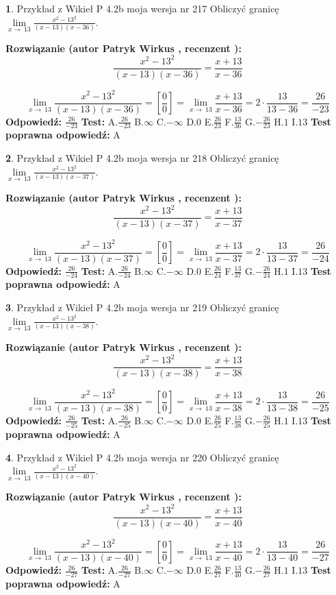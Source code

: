 \documentclass[12pt, a4paper]{article}
\theoremstyle{definition} %
\newtheorem{zad}{}
\newcommand{\zadStart}[1]{\begin{zad}#1\newline}
\newcommand{\zadStop}{\end{zad}}
\newcommand{\rozwStart}[2]{\noindent \textbf{Rozwiązanie (autor #1 , recenzent #2): }\newline}
\newcommand{\rozwStop}{\newline}
\newcommand{\odpStart}{\noindent \textbf{Odpowiedź:}\newline}
\newcommand{\odpStop}{\newline}
\newcommand{\testStart}{\noindent \textbf{Test:}\newline}
\newcommand{\testStop}{\newline}
\newcommand{\kluczStart}{\noindent \textbf{Test poprawna odpowiedź:}\newline}
\newcommand{\kluczStop}{\newline}
\begin{document}
\zadStart{Przykład z Wikieł P 4.2b moja wersja nr 217}
Obliczyć granicę $\lim\limits_{x\to\ 13}\frac{x^{2}-13^{2}}{(x-13)(x-36)}$.
\zadStop
\rozwStart{Patryk Wirkus}{}
$$\frac{x^{2}-13^{2}}{(x-13)(x-36)}=\frac{x+13}{x-36}$$

$$\lim\limits_{x\to\ 13}\frac{x^{2}-13^{2}}{(x-13)(x-36)}=[\frac{0}{0}]=\lim\limits_{x\to\ 13}\frac{x+13}{x-36}=2 \cdot \frac{13}{13-36} = \frac{26}{-23}$$
\rozwStop
\odpStart
$\frac{26}{-23}$
\odpStop
\testStart
A.$\frac{26}{-23}$
B.$\infty$
C.$-\infty$
D.$0$
E.$\frac{26}{23}$
F.$\frac{13}{36}$
G.$-\frac{26}{23}$
H.$1$
I.$13$
\testStop
\kluczStart
A
\kluczStop



\zadStart{Przykład z Wikieł P 4.2b moja wersja nr 218}
Obliczyć granicę $\lim\limits_{x\to\ 13}\frac{x^{2}-13^{2}}{(x-13)(x-37)}$.
\zadStop
\rozwStart{Patryk Wirkus}{}
$$\frac{x^{2}-13^{2}}{(x-13)(x-37)}=\frac{x+13}{x-37}$$

$$\lim\limits_{x\to\ 13}\frac{x^{2}-13^{2}}{(x-13)(x-37)}=[\frac{0}{0}]=\lim\limits_{x\to\ 13}\frac{x+13}{x-37}=2 \cdot \frac{13}{13-37} = \frac{26}{-24}$$
\rozwStop
\odpStart
$\frac{26}{-24}$
\odpStop
\testStart
A.$\frac{26}{-24}$
B.$\infty$
C.$-\infty$
D.$0$
E.$\frac{26}{24}$
F.$\frac{13}{37}$
G.$-\frac{26}{24}$
H.$1$
I.$13$
\testStop
\kluczStart
A
\kluczStop



\zadStart{Przykład z Wikieł P 4.2b moja wersja nr 219}
Obliczyć granicę $\lim\limits_{x\to\ 13}\frac{x^{2}-13^{2}}{(x-13)(x-38)}$.
\zadStop
\rozwStart{Patryk Wirkus}{}
$$\frac{x^{2}-13^{2}}{(x-13)(x-38)}=\frac{x+13}{x-38}$$

$$\lim\limits_{x\to\ 13}\frac{x^{2}-13^{2}}{(x-13)(x-38)}=[\frac{0}{0}]=\lim\limits_{x\to\ 13}\frac{x+13}{x-38}=2 \cdot \frac{13}{13-38} = \frac{26}{-25}$$
\rozwStop
\odpStart
$\frac{26}{-25}$
\odpStop
\testStart
A.$\frac{26}{-25}$
B.$\infty$
C.$-\infty$
D.$0$
E.$\frac{26}{25}$
F.$\frac{13}{38}$
G.$-\frac{26}{25}$
H.$1$
I.$13$
\testStop
\kluczStart
A
\kluczStop



\zadStart{Przykład z Wikieł P 4.2b moja wersja nr 220}
Obliczyć granicę $\lim\limits_{x\to\ 13}\frac{x^{2}-13^{2}}{(x-13)(x-40)}$.
\zadStop
\rozwStart{Patryk Wirkus}{}
$$\frac{x^{2}-13^{2}}{(x-13)(x-40)}=\frac{x+13}{x-40}$$

$$\lim\limits_{x\to\ 13}\frac{x^{2}-13^{2}}{(x-13)(x-40)}=[\frac{0}{0}]=\lim\limits_{x\to\ 13}\frac{x+13}{x-40}=2 \cdot \frac{13}{13-40} = \frac{26}{-27}$$
\rozwStop
\odpStart
$\frac{26}{-27}$
\odpStop
\testStart
A.$\frac{26}{-27}$
B.$\infty$
C.$-\infty$
D.$0$
E.$\frac{26}{27}$
F.$\frac{13}{40}$
G.$-\frac{26}{27}$
H.$1$
I.$13$
\testStop
\kluczStart
A
\kluczStop
\end{document}
